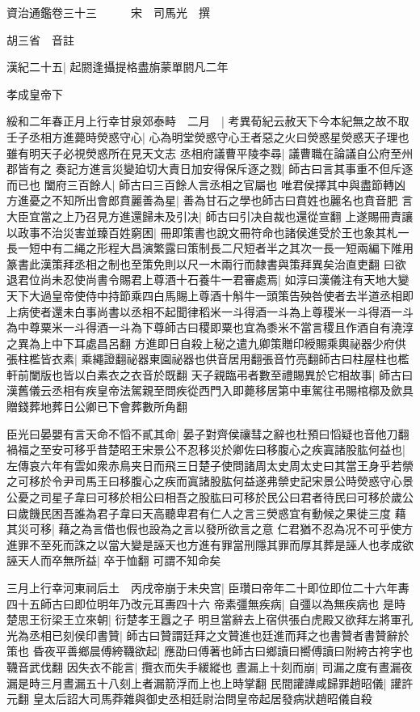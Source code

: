 資治通鑑卷三十三　　　宋　司馬光　撰

胡三省　音註

漢紀二十五|{
	起閼逢攝提格盡旃蒙單閼凡二年}


孝成皇帝下

綏和二年春正月上行幸甘泉郊泰畤　二月　|{
	考異荀紀云赦天下今本紀無之故不取}
壬子丞相方進薨時熒惑守心|{
	心為明堂熒惑守心王者惡之火曰熒惑星熒惑天子理也雖有明天子必視熒惑所在見天文志}
丞相府議曹平陵李尋|{
	議曹職在論議自公府至州郡皆有之}
奏記方進言災變廹切大責日加安得保斥逐之戮|{
	師古曰言其事重不但斥逐而已也}
闔府三百餘人|{
	師古曰三百餘人言丞相之官屬也}
唯君侯擇其中與盡節轉凶方進憂之不知所出會郎賁麗善為星|{
	善為甘石之學也師古曰賁姓也麗名也賁音肥}
言大臣宜當之上乃召見方進還歸未及引决|{
	師古曰引决自裁也還從宣翻}
上遂賜冊責讓以政事不治災害並臻百姓窮困|{
	冊即策書也說文冊符命也諸侯進受於王也象其札一長一短中有二䋲之形程大昌演繁露曰策制長二尺短者半之其次一長一短兩編下陮用篆書此漢策拜丞相之制也至策免則以尺一木兩行而隸書與策拜異矣治直吏翻}
曰欲退君位尚未忍使尚書令賜君上尊酒十石養牛一君審處焉|{
	如淳曰漢儀注有天地大變天下大過皇帝使侍中持節乘四白馬賜上尊酒十斛牛一頭策告殃咎使者去半道丞相即上病使者還未白事尚書以丞相不起聞律稻米一斗得酒一斗為上尊稷米一斗得酒一斗為中尊粟米一斗得酒一斗為下尊師古曰稷即粟也宜為黍米不當言稷且作酒自有澆淳之異為上中下耳處昌呂翻}
方進即日自殺上秘之遣九卿策贈印綬賜乘輿祕器少府供張柱檻皆衣素|{
	乘繩證翻祕器東園祕器也供音居用翻張音竹亮翻師古曰柱屋柱也檻軒前闌版也皆以白素衣之衣音於既翻}
天子親臨弔者數至禮賜異於它相故事|{
	師古曰漢舊儀云丞相有疾皇帝法駕親至問疾從西門入即薨移居第中車駕往弔賜棺槨及歛具贈錢葬地葬日公卿已下會葬數所角翻}


臣光曰晏嬰有言天命不慆不貳其命|{
	晏子對齊侯禳彗之辭也杜預曰慆疑也音他刀翻}
禍福之至安可移乎昔楚昭王宋景公不忍移災於卿佐曰移腹心之疾寘諸股肱何益也|{
	左傳哀六年有雲如衆赤鳥夹日而飛三日楚子使問諸周太史周太史曰其當王身乎若禜之可移於令尹司馬王曰移腹心之疾而寘諸股肱何益遂弗禜史記宋景公時熒惑守心景公憂之司星子韋曰可移於相公曰相吾之股肱曰可移於民公曰君者待民曰可移於歲公曰歲饑民困吾誰為君子韋曰天高聽卑君有仁人之言三熒惑宜有動候之果徙三度}
藉其災可移|{
	藉之為言借也假也設為之言以發所欲言之意}
仁君猶不忍為况不可乎使方進罪不至死而誅之以當大變是誣天也方進有罪當刑隱其罪而厚其葬是誣人也孝成欲誣天人而卒無所益|{
	卒于恤翻}
可謂不知命矣

三月上行幸河東祠后土　丙戌帝崩于未央宫|{
	臣瓚曰帝年二十即位即位二十六年夀四十五師古曰即位明年乃改元耳夀四十六}
帝素彊無疾病|{
	自彊以為無疾病也}
是時楚思王衍梁王立來朝|{
	衍楚孝王囂之子}
明旦當辭去上宿供張白虎殿又欲拜左將軍孔光為丞相已刻侯印書贊|{
	師古曰贊謂廷拜之文贊進也廷進而拜之也書贊者書贊辭於策也}
昏夜平善鄉晨傅絝韈欲起|{
	應劭曰傅著也師古曰鄉讀曰嚮傅讀曰附絝古袴字也韈音武伐翻}
因失衣不能言|{
	攬衣而失手緩縱也}
晝漏上十刻而崩|{
	司漏之度有晝漏夜漏是時三月晝漏五十八刻上者漏箭浮而上也上時掌翻}
民間讙譁咸歸罪趙昭儀|{
	讙許元翻}
皇太后詔大司馬莽雜與御史丞相廷尉治問皇帝起居發病狀趙昭儀自殺

